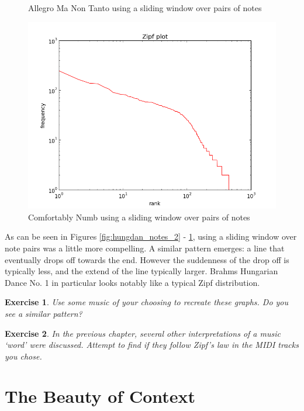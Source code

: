 \documentclass[10pt]{book}
\newtheorem{exercise}{Exercise}[chapter]
\begin{document}
\begin{figure}[!htb]
  \caption{Allegro Ma Non Tanto using a sliding window over pairs of notes}\label{fig:rach_notes_2}
\endminipage\hfill
{}%
  \includegraphics[width=\linewidth]{comf_notes_2}
  \caption{Comfortably Numb using a sliding window over pairs of notes}\label{fig:comf_notes_2}
\endminipage
\end{figure}

As can be seen in Figures \ref{fig:hungdan_notes_2} - \ref{fig:comf_notes_2}, using a sliding window over note pairs was a little more compelling. A similar pattern emerges: a line that eventually drops off towards the end. However the suddenness of the drop off is typically less, and the extend of the line typically larger. Brahms Hungarian Dance No. 1 in particular looks notably like a typical Zipf distribution.


\begin{exercise}
Use some music of your choosing to recreate these graphs. Do you see a similar pattern?
\end{exercise}

\begin{exercise}
In the previous chapter, several other interpretations of a music `word' were discussed. Attempt to find if they follow Zipf's law in the MIDI tracks you chose.
\end{exercise}



\section{The Beauty of Context}
\end{document}
